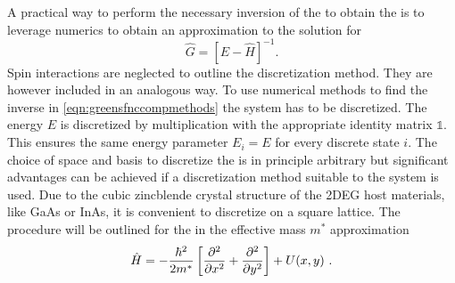 A practical way to perform the necessary inversion of the \hamil{} to obtain the \gfnc{} is to leverage numerics to obtain an approximation to the solution for
\begin{equation}
	\hat{G} = \left[E-\hat{H} \right]^{-1}\text{.}
  \label{eqn:greensfnccompmethods}
\end{equation}
Spin interactions are neglected to outline the discretization method. They are however included in an analogous way. To use numerical methods to find the inverse in \cref{eqn:greensfnccompmethods} the system has to be discretized. The energy $E$ is discretized by multiplication with the appropriate identity matrix $\mathds{1}$. This ensures the same energy parameter $E_i=E$ for every discrete state $i$. The choice of space and basis to discretize the \hamil{} is in principle arbitrary but significant advantages can be achieved if a discretization method suitable to the system is used. Due to the cubic zincblende crystal structure of the 2DEG host materials, like GaAs or InAs, it is convenient to discretize on a square lattice.
The procedure will be outlined for the \hamil{} in the effective mass $m^*$ approximation
\begin{equation}
  \hat{H}=-\frac{\hbar^{2}}{2m^*}\left[\pdd{}{x}+\pdd{}{y}\right]+U(x,y)\ .
    \label{eqn:Hamil}
\end{equation}

